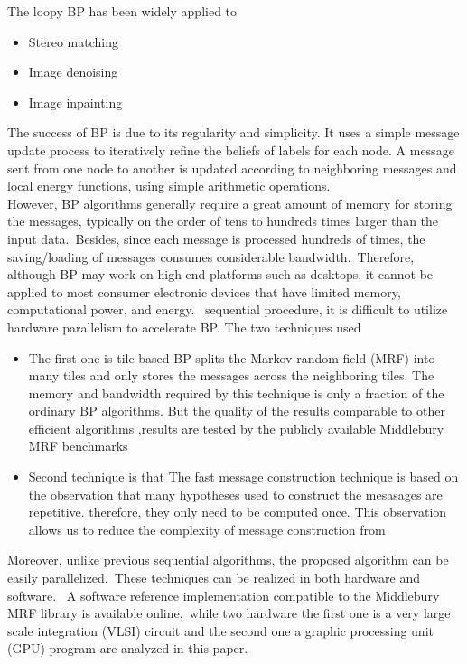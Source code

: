 The loopy BP has been widely applied to

\begin{itemize}
  \item Stereo matching
  \item Image denoising
  \item Image inpainting
\end{itemize}
  The success of BP is due to its regularity and simplicity. It uses a simple message  update  process  to iteratively refine the  beliefs  of labels for each node. A message sent from one node to another is updated according to neighboring messages and local energy functions, using simple arithmetic operations.\\
However, BP algorithms generally require a great amount of memory for storing the messages, typically on the order of tens to hundreds times larger than the input data.\ Besides, since each message is processed hundreds of times, the saving/loading of  messages consumes considerable bandwidth.\ Therefore, although BP may work on high-end platforms such as desktops, it cannot be applied to most consumer electronic devices that have limited memory, computational power, and energy. \ sequential procedure,  it  is  difficult to  utilize  hardware  parallelism  to accelerate BP.
The  two techniques  used
\begin{itemize}
  \item The first one is tile-based BP   splits the Markov random field (MRF) into many tiles and only stores the messages across the neighboring tiles. The memory and bandwidth required by this technique is only a fraction of the ordinary BP algorithms. But the quality of the results comparable to other efficient algorithms ,results are   tested by the publicly available Middlebury MRF benchmarks

  \item Second technique is that The fast message construction technique is based on the observation that many hypotheses used to construct the mesasages are repetitive. therefore, they only need to be computed once. This observation allows us to reduce the complexity of message construction from

\end{itemize}

Moreover, unlike previous sequential algorithms, the proposed algorithm can be easily parallelized.\
These techniques can be realized in both hardware and software. \ A software reference implementation compatible to  the  Middlebury  MRF  library  is  available  online,\ while two hardware the first one is a very large scale integration (VLSI) circuit and the second one a graphic processing unit (GPU) program are analyzed in this paper.



